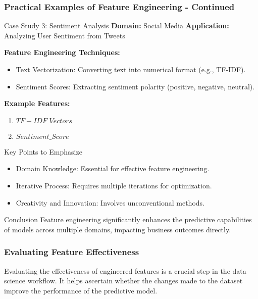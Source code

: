\documentclass[aspectratio=169]{beamer}
\begin{document}
\begin{frame}[fragile]
    \frametitle{Practical Examples of Feature Engineering - Continued}
    
    \begin{block}{Case Study 3: Sentiment Analysis}
        \textbf{Domain:} Social Media \hfill \textbf{Application:} Analyzing User Sentiment from Tweets
        
        \textbf{Feature Engineering Techniques:}
        \begin{itemize}
            \item Text Vectorization: Converting text into numerical format (e.g., TF-IDF).
            \item Sentiment Scores: Extracting sentiment polarity (positive, negative, neutral).
        \end{itemize}

        \textbf{Example Features:}
        \begin{enumerate}
            \item $TF-IDF\_Vectors$
            \item $Sentiment\_Score$
        \end{enumerate}
    \end{block}

    \begin{block}{Key Points to Emphasize}
        \begin{itemize}
            \item Domain Knowledge: Essential for effective feature engineering.
            \item Iterative Process: Requires multiple iterations for optimization.
            \item Creativity and Innovation: Involves unconventional methods.
        \end{itemize}
    \end{block}

    \begin{block}{Conclusion}
        Feature engineering significantly enhances the predictive capabilities of models across multiple domains, impacting business outcomes directly.
    \end{block}
\end{frame}

\begin{frame}[fragile]
    \frametitle{Evaluating Feature Effectiveness}
    Evaluating the effectiveness of engineered features is a crucial step in the data science workflow. 
    It helps ascertain whether the changes made to the dataset improve the performance of the predictive model.
\end{frame}
\end{document}
